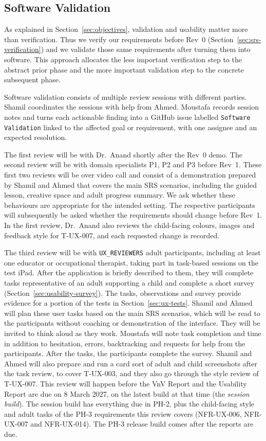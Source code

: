 \documentclass[12pt, titlepage]{article}
\begin{document}
\subsection{Software Validation}
\label{sec:software-validation}

As explained in Section~\ref{sec:objectives}, validation and usability matter
more than verification. Thus we verify our requirements before Rev~0
(Section~\ref{sec:srs-verification}) and we validate those same requirements
after turning them into software. This approach allocates the 
less important verification step to the abstract prior phase and the more 
important validation step to the concrete subsequent phase.

Software validation consists of multiple review sessions with different 
parties. Shamil coordinates the sessions with help from Ahmed. Moustafa 
records session notes and turns each actionable finding into a GitHub 
issue labelled \texttt{Software Validation} linked to the affected goal 
or requirement, with one assignee and an expected resolution. 

The first review will be with Dr.\ Anand shortly after the Rev~0 demo. The
second review will be with domain specialists P1, P2 and P3 before Rev~1. 
These first two reviews will be over video call and consist of a demonstration 
prepared by Shamil and Ahmed that covers the main SRS scenarios, including
the guided lesson, creative space and adult progress summary. We ask whether
these behaviours are appropriate for the intended setting.
The respective participants will subsequently be asked whether the requirements
should change before Rev~1. In the first review, Dr.\ Anand also reviews the
child-facing colours, images and feedback style for T-UX-007, and each requested
change is recorded.

The third review will be with \texttt{UX\_REVIEWERS} adult participants,
including at least one educator or occupational therapist, taking part in
task-based sessions on the test iPad. After the application is briefly described to them,
they will complete tasks representative of an adult supporting a child and 
complete a short survey (Section~\ref{sec:usability-survey}). The tasks,
observations and survey provide evidence for a portion of the tests in
Section~\ref{sec:ux-tests}. Shamil and Ahmed will plan these user tasks
based on the main SRS scenarios, which will be read to the participants without
coaching or demonstration of the interface. They will be invited to think 
aloud as they work. Moustafa will note task completion and time in addition to hesitation, errors, backtracking and requests for help from the participants. 
After the tasks, the participants complete the survey. Shamil and Ahmed will 
also prepare and run a card sort of adult and child screenshots after the 
task review, to cover T-UX-003, and they also go through the style review of T-UX-007. This
review will happen before the VnV Report and the Usability Report are due on 8
March 2027, on the latest build at that time (the \emph{session build}). The
session build has everything due in PH-2, plus the child-facing style and adult
tasks of the PH-3 requirements this review covers (NFR-UX-006, NFR-UX-007 and
NFR-UX-014). The PH-3 release build comes after the reports are due.
\end{document}
